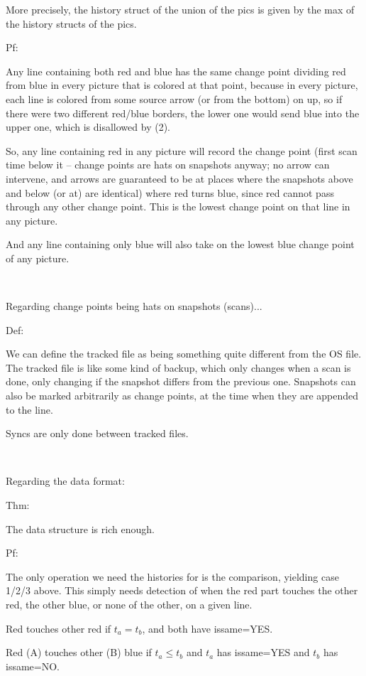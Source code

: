 \documentclass{book}
\begin{document}
More precisely, the history struct of the union of the pics is given by the max of the history structs of the pics.

Pf:

Any line containing both red and blue has the same change point dividing red from blue in every picture that is colored at that point, because in every picture, each line is colored from some source arrow (or from the bottom) on up, so if there were two different red/blue borders, the lower one would send blue into the upper one, which is disallowed by (2).

So, any line containing red in any picture will record the change point (first scan time below it -- change points are hats on snapshots anyway; no arrow can intervene, and arrows are guaranteed to be at places where the snapshots above and below (or at) are identical) where red turns blue, since red cannot pass through any other change point.  This is the lowest change point on that line in any picture.

And any line containing only blue will also take on the lowest blue change point of any picture.

~

Regarding change points being hats on snapshots (scans)...

Def:

We can define the tracked file as being something quite different from the OS file.  The tracked file is like some kind of backup, which only changes when a scan is done, only changing if the snapshot differs from the previous one.  Snapshots can also be marked arbitrarily as change points, at the time when they are appended to the line.

Syncs are only done between tracked files.

~

Regarding the data format:

Thm:

The data structure is rich enough.

Pf:

The only operation we need the histories for is the comparison, yielding case 1/2/3 above.  This simply needs detection of when the red part touches the other red, the other blue, or none of the other, on a given line.

Red touches other red if $t_a=t_b$, and both have issame=YES.

Red (A) touches other (B) blue if $t_a ≤ t_b$ and $t_a$ has issame=YES and $t_b$ has issame=NO.
\end{document}
